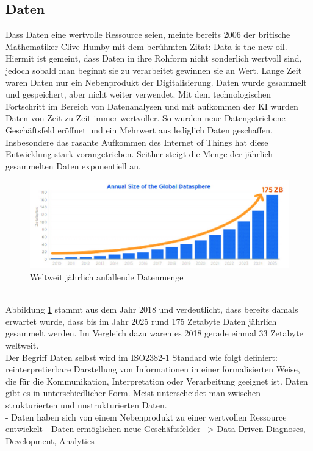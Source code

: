 \begin{onehalfspace}
    \subsection{Daten}
    \label{subsubsec:daten}
        Dass Daten eine wertvolle Ressource seien, meinte bereits 2006 der britische Mathematiker Clive Humby mit dem berühmten Zitat: \glqq{}Data is the new oil\grqq{}. Hiermit ist gemeint, dass Daten in ihre Rohform nicht sonderlich wertvoll sind, jedoch sobald man beginnt sie zu verarbeitet gewinnen sie an Wert. Lange Zeit waren Daten nur ein Nebenprodukt der Digitalisierung. Daten wurde gesammelt und gespeichert, aber nicht weiter verwendet. Mit dem technologischen Fortschritt im Bereich von Datenanalysen und mit aufkommen der \ac{KI} wurden Daten von Zeit zu Zeit immer wertvoller. So wurden neue Datengetriebene Geschäftsfeld eröffnet und ein Mehrwert aus lediglich Daten geschaffen. Insbesondere das rasante Aufkommen des Internet of Things hat diese Entwicklung stark vorangetrieben. Seither steigt die Menge der jährlich gesammelten Daten exponentiell an.\cite{Otto2019}
        \\
        \begin{figure}[h]
            \centering
            \includegraphics[width = 15cm]{Bilder/Annual_Data_Size.png}
            \caption{Weltweit jährlich anfallende Datenmenge \cite{Reinsel2018}}
            \label{fig:DataSize}
        \end{figure}
        \\
        Abbildung \ref{fig:DataSize} stammt aus dem Jahr 2018 und verdeutlicht, dass bereits damals erwartet wurde, dass bis im Jahr 2025 rund 175 Zetabyte Daten jährlich gesammelt werden. Im Vergleich dazu waren es 2018 gerade einmal 33 Zetabyte weltweit. \cite{Reinsel2018}
        \\
        Der Begriff Daten selbst wird im ISO2382-1 Standard wie folgt definiert: \glqq{}reinterpretierbare Darstellung von Informationen in einer formalisierten Weise, die für die Kommunikation, Interpretation oder Verarbeitung geeignet ist\grqq{}. \cite{ISO2382} Daten gibt es in unterschiedlicher Form. Meist unterscheidet man zwischen strukturierten und unstrukturierten Daten. 
        \\
        - Daten haben sich von einem Nebenprodukt zu einer wertvollen Ressource entwickelt
        - Daten ermöglichen neue Geschäftsfelder --> Data Driven Diagnoses, Development, Analytics


\end{onehalfspace}
